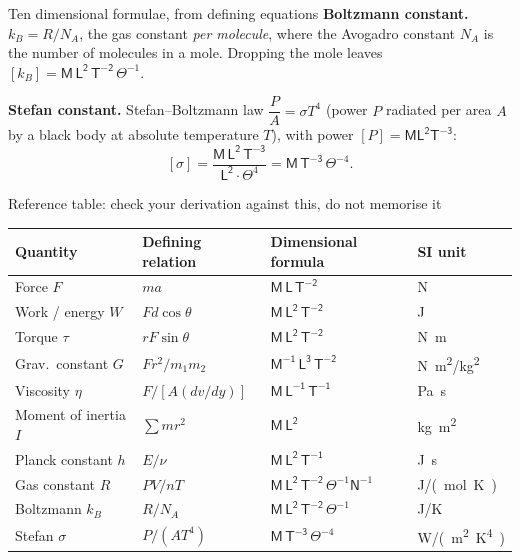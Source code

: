 \begin{derivbox}{Ten dimensional formulae, from defining equations}
 \textbf{Boltzmann constant.} $k_B=R/N_A$, the gas constant \emph{per molecule}, where the Avogadro constant $N_A$ is
the number of molecules in a mole. Dropping the
mole leaves $[k_B]=\boxed{\mathsf{M\,L^{2}\,T^{-2}}\,\Theta^{-1}}$.

 \textbf{Stefan constant.} Stefan--Boltzmann law $\dfrac{P}{A}=\sigma T^{4}$ (power $P$ radiated per area $A$ by a
black body at absolute temperature $T$), with power
$[P]=\mathsf{M L^{2}T^{-3}}$:
\[
[\sigma]=\frac{\mathsf{M\,L^{2}\,T^{-3}}}{\mathsf{L^{2}}\cdot\Theta^{4}}
=\boxed{\mathsf{M\,T^{-3}}\,\Theta^{-4}}.
\]
\end{derivbox}

\begin{tablebox}{Reference table: check your derivation against this, do not memorise it}
\begin{center}
\begin{tabular}{@{}llll@{}}
\toprule
Quantity & Defining relation & Dimensional formula & SI unit\\
\midrule
Force $F$              & $ma$                  & $\mathsf{M\,L\,T^{-2}}$                          & \si{N}\\
Work / energy $W$      & $Fd\cos\theta$        & $\mathsf{M\,L^{2}\,T^{-2}}$                      & \si{J}\\
Torque $\tau$          & $rF\sin\theta$        & $\mathsf{M\,L^{2}\,T^{-2}}$                      & \si{N.m}\\
Grav.\ constant $G$    & $Fr^{2}/m_1m_2$       & $\mathsf{M^{-1}\,L^{3}\,T^{-2}}$                 & \si{N.m^2/kg^2}\\
Viscosity $\eta$       & $F/[A(dv/dy)]$        & $\mathsf{M\,L^{-1}\,T^{-1}}$                     & \si{Pa.s}\\
Moment of inertia $I$  & $\sum mr^{2}$         & $\mathsf{M\,L^{2}}$                              & \si{kg.m^2}\\
Planck constant $h$    & $E/\nu$               & $\mathsf{M\,L^{2}\,T^{-1}}$                      & \si{J.s}\\
Gas constant $R$       & $PV/nT$               & $\mathsf{M\,L^{2}\,T^{-2}}\,\Theta^{-1}\mathsf{N}^{-1}$ & \si{J/(mol.K)}\\
Boltzmann $k_B$        & $R/N_A$               & $\mathsf{M\,L^{2}\,T^{-2}}\,\Theta^{-1}$          & \si{J/K}\\
Stefan $\sigma$        & $P/(AT^{4})$          & $\mathsf{M\,T^{-3}}\,\Theta^{-4}$                 & \si{W/(m^2.K^4)}\\
\bottomrule
\end{tabular}
\end{center}
\end{tablebox}

